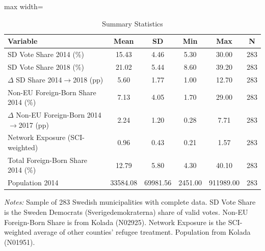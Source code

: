 \begin{table}[htbp]
\centering
\caption{Summary Statistics}
\label{tab:summary}
\begin{adjustbox}{max width=\textwidth}
\begin{tabular}{lccccc}
\hline\hline
Variable & Mean & SD & Min & Max & N \\
\hline
SD Vote Share 2014 (\%) & 15.43 & 4.46 & 5.30 & 30.00 & 283 \\
SD Vote Share 2018 (\%) & 21.02 & 5.44 & 8.60 & 39.20 & 283 \\
$\Delta$ SD Share 2014$\to$2018 (pp) & 5.60 & 1.77 & 1.00 & 12.70 & 283 \\
Non-EU Foreign-Born Share 2014 (\%) & 7.13 & 4.05 & 1.70 & 29.00 & 283 \\
$\Delta$ Non-EU Foreign-Born 2014$\to$2017 (pp) & 2.24 & 1.20 & 0.28 & 7.71 & 283 \\
Network Exposure (SCI-weighted) & 0.96 & 0.43 & 0.21 & 1.57 & 283 \\
Total Foreign-Born Share 2014 (\%) & 12.79 & 5.80 & 4.30 & 40.10 & 283 \\
Population 2014 & 33584.08 & 69981.56 & 2451.00 & 911989.00 & 283 \\
\hline\hline
\end{tabular}
\end{adjustbox}
\begin{tablenotes}[flushleft]
\small
\item \textit{Notes:} Sample of 283 Swedish municipalities with complete data. SD Vote Share is the Sweden Democrats (Sverigedemokraterna) share of valid votes. Non-EU Foreign-Born Share is from Kolada (N02925). Network Exposure is the SCI-weighted average of other counties' refugee treatment. Population from Kolada (N01951).
\end{tablenotes}
\end{table}

